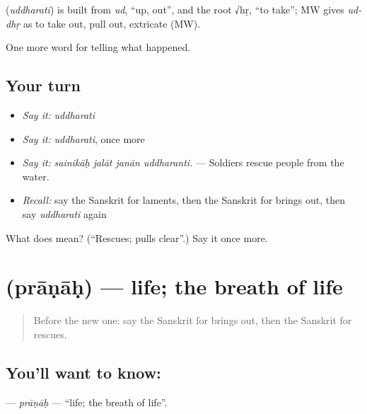 \begin{cousinweb}
\textbf{} (\emph{uddharati}) is built from \emph{ud}, \textquotedblleft{}up, out\textquotedblright{}, and the root √hṛ, \textquotedblleft{}to take\textquotedblright{}; MW gives \emph{ud-dhṛ} as to take out, pull out, extricate (MW).
\end{cousinweb}

\begin{grammarlens}[title={What you've built}]
One more word for telling what happened.
\end{grammarlens}

\subsection*{Your turn}
\begin{itemize}
\raggedright
  \item \emph{Say it:} \emph{uddharati}
  \item \emph{Say it:} \emph{uddharati}, once more
  \item \emph{Say it:} \emph{sainikāḥ jalāt janān uddharanti.} — Soldiers rescue people from the water.
  \item \emph{Recall:} say the Sanskrit for laments, then the Sanskrit for brings out, then say \emph{uddharati} again
\end{itemize}

\begin{tcolorbox}[breakable,colback=teal!4,colframe=teal!35!black,title={Before you move on}]
What does  mean? (\textquotedblleft{}Rescues; pulls clear\textquotedblright{}.) Say it once more.
\end{tcolorbox}
\section[\texorpdfstring{\sk{प्राणाः} (prāṇāḥ)}{प्राणाः (prāṇāḥ)}]{ (prāṇāḥ) — life; the breath of life}

\label{lesson:SA-C305-pranah}



\begin{quote}
Before the new one: say the Sanskrit for brings out, then the Sanskrit for rescues.
\end{quote}

\subsection*{You'll want to know: }
\textbf{} — \emph{prāṇāḥ} — \textquotedblleft{}life; the breath of life\textquotedblright{}.

